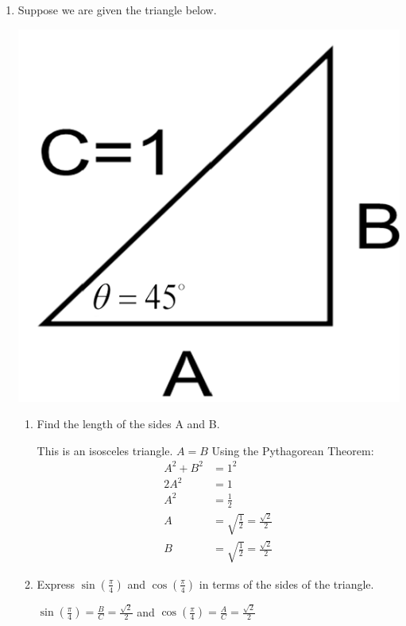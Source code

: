 \documentclass[nooutcomes]{ximera}
\begin{document}
\begin{problem}
\begin{enumerate}
	\item Suppose we are given the triangle below.  
		\begin{image}
		\includegraphics[scale=.3]{figure2.png}
		\end{image}

		\begin{enumerate}
	\item Find the length of the sides A and B.
	\begin{freeResponse}
	This is an isosceles triangle. $A=B$  Using the Pythagorean Theorem:
	\begin{align*}
	A^2+B^2&=1^2\\
	2A^2&=1 \\ 	
	A^2&=\frac{1}{2}\\
	A&=\sqrt{\frac{1}{2}}=\frac{\sqrt{2}}{2}\\
	B&=\sqrt{\frac{1}{2}}=\frac{\sqrt{2}}{2}
	\end{align*}
	\end{freeResponse}

	\item Express $\sin\left(\frac{\pi}{4}\right)$ and $\cos\left(\frac{\pi}{4}\right)$ in terms of the sides of the triangle.

	\begin{freeResponse}
	$\sin\left(\frac{\pi}{4}\right)=\frac{B}{C}=\frac{\sqrt{2}}{2}$ and $\cos\left(\frac{\pi}{4}\right)=\frac{A}{C}=\frac{\sqrt{2}}{2}$


\end{freeResponse}
\end{enumerate}
\end{enumerate}
\end{problem}
\end{document}
